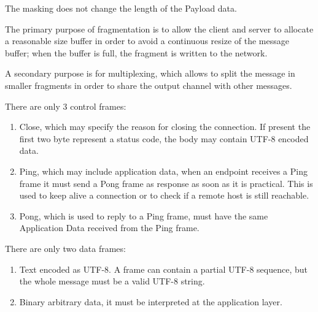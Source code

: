 The masking does not change the length of the Payload data.\newline

The primary purpose of fragmentation is to allow the client and server to allocate a reasonable size buffer in order to avoid a continuous resize of the message buffer; when the buffer is full, the fragment is written to the network.\newline

A secondary purpose is for multiplexing, which allows to split the message in smaller fragments in order to share the output channel with other messages.\newline

There are only 3 control frames:
\begin{enumerate}
	\item Close, which may specify the reason for closing the connection.
	If present the first two byte represent a status code, the body may contain UTF-8 encoded data.
	\item Ping, which may include application data, when an endpoint receives a Ping frame it must send a Pong frame as response as soon as it is practical.
	This is used to keep alive a connection or to check if a remote host is still reachable.
	\item Pong, which is used to reply to a Ping frame, must have the same Application Data received from the Ping frame.
\end{enumerate}

There are only two data frames:
\begin{enumerate}
	\item Text encoded as UTF-8.
	A frame can contain a partial UTF-8 sequence, but the whole message must be a valid UTF-8 string.
	\item Binary arbitrary data, it must be interpreted at the application layer.
\end{enumerate}

